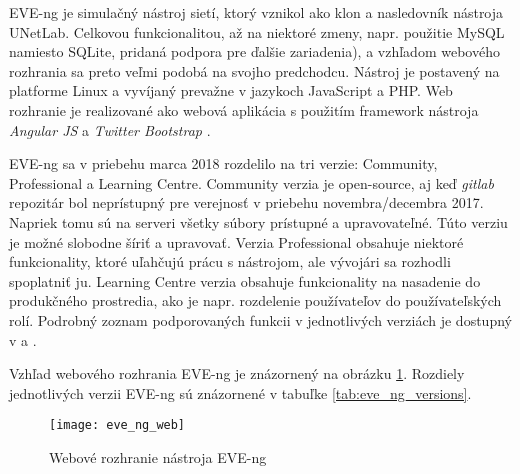 EVE-ng je simulačný nástroj sietí, ktorý vznikol ako klon a nasledovník nástroja UNetLab. Celkovou funkcionalitou, až na niektoré zmeny, napr. použitie MySQL namiesto SQLite, pridaná podpora pre ďalšie zariadenia), a vzhľadom webového rozhrania sa preto veľmi podobá na svojho predchodcu. Nástroj je postavený na platforme Linux a vyvíjaný prevažne v jazykoch JavaScript a PHP. Web rozhranie je realizované ako webová aplikácia s použitím framework nástroja \emph{Angular JS} a \emph{Twitter Bootstrap} \cite{eve_ng_technologies}.

EVE-ng sa v priebehu marca 2018 rozdelilo na tri verzie: Community, Professional a Learning Centre. Community verzia je open-source, aj keď \emph{gitlab} repozitár bol neprístupný pre verejnosť v priebehu novembra/decembra 2017. Napriek tomu sú na serveri všetky súbory prístupné a upravovateľné. Túto verziu je možné slobodne šíriť a upravovať. Verzia Professional obsahuje niektoré funkcionality, ktoré uľahčujú prácu s nástrojom, ale vývojári sa rozhodli spoplatniť ju. Learning Centre verzia obsahuje funkcionality na nasadenie do produkčného prostredia, ako je napr. rozdelenie používateľov do používateľských rolí. Podrobný zoznam podporovaných funkcii v jednotlivých verziách je dostupný v \cite{eve_ng_versions_table} a \cite{eve_ng_versions_list}.

Vzhľad webového rozhrania EVE-ng je znázornený na obrázku \ref{obr:eve_ng_web}. Rozdiely jednotlivých verzii EVE-ng sú znázornené v tabuľke \ref{tab:eve_ng_versions}.

\begin{figure}
    \centering
    \texttt{[image: eve\_ng\_web]}
    \caption{Webové rozhranie nástroja EVE-ng}
    \label{obr:eve_ng_web}
\end{figure}

